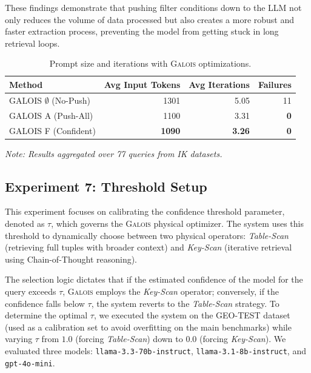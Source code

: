 These findings demonstrate that pushing filter conditions down to the LLM not only reduces the volume of data processed but also creates a more robust and faster extraction process, preventing the model from getting stuck in long retrieval loops.
\begin{table}[H]
    \centering
    \caption{Prompt size and iterations with \textsc{Galois} optimizations.}
    \label{tab:exp6-prompt-size}
    \begin{tabular}{lrrr}
        \toprule
        \textbf{Method} & \textbf{Avg Input Tokens} & \textbf{Avg Iterations} & \textbf{Failures} \\
        \midrule
        GALOIS $\emptyset$ (No-Push) & 1301 & 5.05 & 11 \\
        GALOIS A (Push-All) & 1100 & 3.31 & \textbf{0} \\
        GALOIS F (Confident) & \textbf{1090} & \textbf{3.26} & \textbf{0} \\
        \bottomrule
    \end{tabular}
    \vspace{0.1cm}
    
    \footnotesize \textit{Note: Results aggregated over 77 queries from IK datasets.}
\end{table}

\subsection{Experiment 7: Threshold Setup}
This experiment focuses on calibrating the confidence threshold parameter, denoted as $\tau$, which governs the \textsc{Galois} physical optimizer. The system uses this threshold to dynamically choose between two physical operators: \textit{Table-Scan} (retrieving full tuples with broader context) and \textit{Key-Scan} (iterative retrieval using Chain-of-Thought reasoning).

The selection logic dictates that if the estimated confidence of the model for the query exceeds $\tau$, \textsc{Galois} employs the \textit{Key-Scan} operator; conversely, if the confidence falls below $\tau$, the system reverts to the \textit{Table-Scan} strategy. To determine the optimal $\tau$, we executed the system on the GEO-TEST dataset (used as a calibration set to avoid overfitting on the main benchmarks) while varying $\tau$ from $1.0$ (forcing \textit{Table-Scan}) down to $0.0$ (forcing \textit{Key-Scan}). We evaluated three models: \texttt{llama-3.3-70b-instruct}, \texttt{llama-3.1-8b-instruct}, and \texttt{gpt-4o-mini}.

